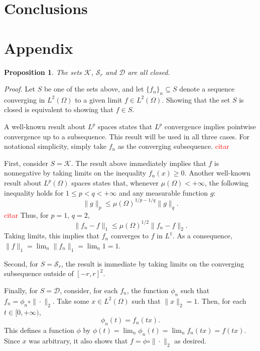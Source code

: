 \documentclass[twocolumn,twoside,a4paper,10pt]{IEEEtran}
\newtheorem{proposition}{Proposition}
\newcommand{\Frank}[1]{\textcolor{red}{#1}}
\begin{document}
\section{Conclusions}

\section{Appendix}

\begin{proposition}\label{prop:closed-sets}
  The sets \(\mathcal{K}\), \(\mathcal{S}_r\) and \(\mathcal{D}\) are all closed.
\end{proposition}
\textit{Proof.} 
Let \(S\) be one of the sets above, and let \(\{f_n\}_n\subseteq S\) denote a sequence converging in \(L^2(\Omega)\) to a given limit \(f\in L^2(\Omega)\). Showing that the set \(S\) is closed is equivalent to showing that \(f\in S\).

A well-known result about \(L^p\) spaces states that \(L^p\) convergence implies pointwise convergence up to a subsequence. This result will be used in all three cases. For notational simplicity, simply take \(f_n\) as the converging subsequence. \Frank{citar}

First, consider \(S=\mathcal{K}\). The result above immediately implies that \(f\) is nonnegative by taking limits on the inequality \(f_n(x) \geq 0\). Another well-known result about \(L^p(\Omega)\) spaces states that, whenever \(\mu(\Omega)<+\infty\), the following inequality holds for \(1\leq p < q < +\infty\) and any measurable function \(g\):
\[
  \|g\|_p \leq \mu(\Omega)^{1/p - 1/q} \|g\|_q
.\]
\Frank{citar}
Thus, for \(p=1\), \(q=2\),
\[
  \|f_n-f\|_1 \leq \mu(\Omega)^{1/2}\|f_n - f\|_2
.\]
Taking limits, this implies that \(f_n\) converges to \(f\) in \(L^1\). As a consequence, \(\|f\|_{1}=\lim_n \|f_n\|_{1}=\lim_n 1 = 1\).

Second, for \(S=\mathcal{S}_r\), the result is immediate by taking limits on the converging subsequence outside of \([-r, r]^2\).

Finally, for \(S=\mathcal{D}\), consider, for each \(f_n\), the function \(\phi_n\) such that \(f_n=\phi_n \circ \|\cdot\|_{2}\). Take some \(x\in L^2(\Omega)\) such that \(\|x\|_{2}=1\). Then, for each \(t\in[0, +\infty)\),
\[
  \phi_n(t) = f_n(tx)
.\]
This defines a function \(\phi\) by \(\phi(t)=\lim_n\phi_n(t)=\lim_nf_n(tx)=f(tx)\). Since \(x\) was arbitrary, it also shows that \(f=\phi\circ\|\cdot\|_{2}\) as desired.


\end{document}
